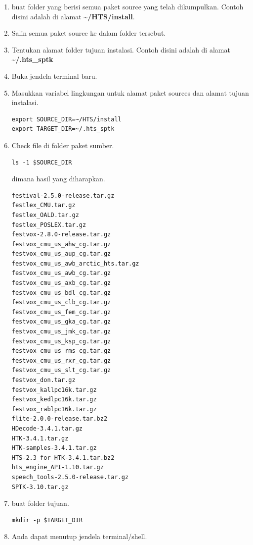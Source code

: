 \documentclass[12pt,]{article}
\begin{document}
	\begin{enumerate}
		\item buat folder yang berisi semua paket source yang telah dikumpulkan.
		Contoh disini adalah di alamat \textbf{\textasciitilde/HTS/install}.
		
		\item Salin semua paket source ke dalam folder tersebut.
		
		\item Tentukan alamat folder tujuan instalasi.
		Contoh disini adalah di alamat \textbf{\textasciitilde/.hts\_sptk}
		
		\item Buka jendela terminal baru.
		
		\item Masukkan variabel lingkungan untuk alamat paket sources dan alamat tujuan instalasi.
		\begin{verbatim}
export SOURCE_DIR=~/HTS/install
export TARGET_DIR=~/.hts_sptk
		\end{verbatim}
		
		\item Check file di folder paket sumber.
		\begin{verbatim}
ls -1 $SOURCE_DIR
		\end{verbatim}
		
		dimana hasil yang diharapkan.
	\begin{verbatim}
festival-2.5.0-release.tar.gz
festlex_CMU.tar.gz
festlex_OALD.tar.gz
festlex_POSLEX.tar.gz
festvox-2.8.0-release.tar.gz
festvox_cmu_us_ahw_cg.tar.gz
festvox_cmu_us_aup_cg.tar.gz
festvox_cmu_us_awb_arctic_hts.tar.gz
festvox_cmu_us_awb_cg.tar.gz
festvox_cmu_us_axb_cg.tar.gz
festvox_cmu_us_bdl_cg.tar.gz
festvox_cmu_us_clb_cg.tar.gz
festvox_cmu_us_fem_cg.tar.gz
festvox_cmu_us_gka_cg.tar.gz
festvox_cmu_us_jmk_cg.tar.gz
festvox_cmu_us_ksp_cg.tar.gz
festvox_cmu_us_rms_cg.tar.gz
festvox_cmu_us_rxr_cg.tar.gz
festvox_cmu_us_slt_cg.tar.gz
festvox_don.tar.gz
festvox_kallpc16k.tar.gz
festvox_kedlpc16k.tar.gz
festvox_rablpc16k.tar.gz
flite-2.0.0-release.tar.bz2
HDecode-3.4.1.tar.gz
HTK-3.4.1.tar.gz
HTK-samples-3.4.1.tar.gz
HTS-2.3_for_HTK-3.4.1.tar.bz2
hts_engine_API-1.10.tar.gz
speech_tools-2.5.0-release.tar.gz
SPTK-3.10.tar.gz
	\end{verbatim}
	
	\newpage
	\item buat folder tujuan.
	\begin{verbatim}
mkdir -p $TARGET_DIR
	\end{verbatim}
	
	\item Anda dapat menutup jendela terminal/shell.
		
	\end{enumerate}
\end{document}
